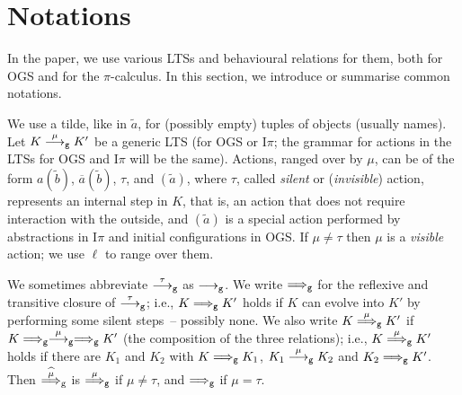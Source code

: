 \documentclass[11pt,a4paper]{amsart}
\theoremstyle{plain}
\theoremstyle{definition}
\theoremstyle{defC}
\theoremstyle{thmC}
\theoremstyle{plain}
\numberwithin{equation}{section}
\def\finish#1{\vskip.2cm\noindent{\em #1}%
  \marginpar{$\longleftarrow$}\vskip.2cm}
\newcommand{\finish}[1]{}
\def\inp#1#2{#1(#2)}
\def\bout#1#2{\overline{#1}(#2)}   %
\newcommand{\rmm}[1]{{\tt{\lowercase{#1}}}}
\newcommand{\genarr}[2]{\mathrel{\stackrel{{#1}}{\longrightarrow}_{\rmm{\lowercase{#2}}}}}
\newcommand{\genArr}[2]{\mathrel{\stackrel{{#1}}{\Longrightarrow}_{\rmm{\lowercase{#2}}}}}  %
\newcommand{\genArcap}[2]{\mathrel{\stackrel{{\widehat{#1}}}{\Longrightarrow}_{\rm{\lowercase{#2}}}}}
\newcommand{\genlongrightarrow}[1]{\mathrel{\longrightarrow_{\rmm{\lowercase{#1}}}}}
\newcommand{\genLongrightarrow}[1]{\mathrel{\Longrightarrow_{\rmm{\lowercase{#1}}}}}
\newcommand{\longrightarrowG}{\genlongrightarrow{G}}
\newcommand{\LongrightarrowG}{\genLongrightarrow{G}}
\newcommand{\arrG}[1]{\genarr{#1}{G}}   %
\newcommand{\ArrG}[1]{\genArr{#1}{G}}   %
\newcommand{\ArcapG}[1]{\genArcap{#1}{G}}   %
\newcommand{\til}[1]{\widetilde{#1}}
\newcommand{\tilb}{{\til b}}
\newcommand{\tila}{{\til a}}
\newcommand{\Intp}{\mbox{I$\pi$}\xspace}   %
\newcommand{\piI}{\Intp}   %
\theoremstyle{plain}
\theoremstyle{definition}
\begin{document}


\section{Notations}
\label{s:nota}

In the paper, we use various LTSs and behavioural relations for them, 
both for OGS and for the $\pi$-calculus.  
In this section, we introduce or summarise common notations. 

We use a tilde, like in $\til a$, for  (possibly empty) tuples of objects (usually names). 
Let $ K \arrG \mu K'$ be a generic LTS (for OGS or \piI; the grammar for actions in the
LTSs  for OGS
and \piI will be the same). 
Actions, ranged over by $\mu$,  can be of the form $\inp a \tilb$, $\bout a \tilb$,
$\tau$,  and $(\tila)$, where $\tau$, called \emph{silent} or (\emph{invisible}) action, 
represents an internal step in $K$, that is, an action that does not require interaction
with the outside,  and $(\tila)$ is  a special action performed by abstractions in \piI
and initial configurations in OGS.   If $\mu \neq \tau$ then $\mu$ is a \emph{visible} action; we use
$\ell$ to range over them.

We sometimes abbreviate $\arrG\tau$ as $ \longrightarrowG $.
We  write $ \LongrightarrowG$ for the reflexive and transitive closure of 
$\arrG\tau$;
i.e., $K
\LongrightarrowG K'
 $ holds if $K $ can evolve into $K'$ by performing some
silent steps~-- possibly none.
We also write 
$K \ArrG \mu K' $ if   $K \LongrightarrowG \arrG\mu \LongrightarrowG K' $ (the
composition of the three 
relations); i.e.,  
$K \ArrG \mu K'$ holds if there are $K_1 $ and $K_2$ with 
$K \LongrightarrowG K_1$, $K_1 \arrG\mu K_2$ 
and $K_2 \LongrightarrowG K'$.
Then $ \ArcapG \mu  $  is  $\ArrG \mu $ if $\mu\neq \tau$, and  
$\LongrightarrowG $ if $\mu=\tau$. 
\end{document}
